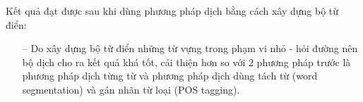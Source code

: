\begin{table}[htp]
\begin{center}
   \caption{Hình ảnh minh họa dữ liệu trước khi dịch và sau khi dịch bằng phương pháp xây dựng từ điển}
    \label{fig:trainingdata-tudien}
    \end{center}
\end{table}

Kết quả đạt được sau khi dùng phương pháp dịch bằng cách xây dựng bộ từ điển:
\begin{itemize}
    \item[--] Do xây dựng bộ từ điển những từ vựng trong phạm vi nhỏ - hỏi đường nên bộ dịch cho ra kết quả khá tốt, cải thiện hơn so với 2 phương pháp trước là phương pháp dịch từng từ và phương pháp dịch dùng tách từ (word segmentation) và gán nhãn từ loại (POS tagging).
\end{itemize}

